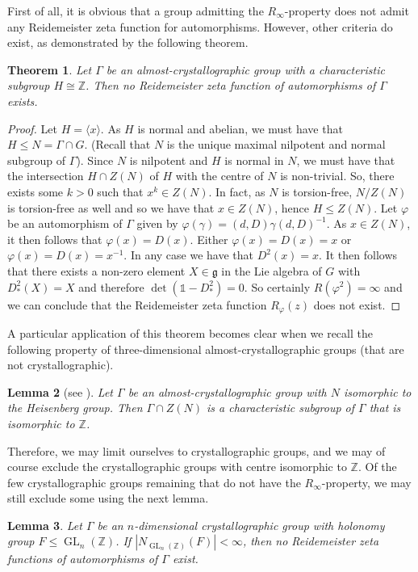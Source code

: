 \documentclass[a4paper]{article}
\theoremstyle{plain}
\newtheorem{theorem}{Theorem}[section]
\newtheorem{lemma}[theorem]{Lemma}
\theoremstyle{definition}
\theoremstyle{remark}
\DeclareMathOperator{\GL}{GL}
\newcommand{\I}{\mathds{1}}
\newcommand{\ZZ}{{\mathbb{Z}}}
\newcommand{\lie}[1]{{\mathfrak {#1}}}
\begin{document}
First of all, it is obvious that a group admitting the \(R_\infty\)-property does not admit any Reidemeister zeta function for automorphisms. However, other criteria do exist, as demonstrated by the following theorem.
\begin{theorem}
	Let \(\Gamma\) be an almost-crystallographic group with a characteristic subgroup \(H \cong \ZZ\). Then no Reidemeister zeta function of automorphisms of \(\Gamma\) exists.
\end{theorem}
\begin{proof}
	Let \(H = \langle x \rangle\). As \(H\) is normal and abelian, we must have that \(H\leq N =\Gamma\cap G\). (Recall that \(N\) is the unique maximal nilpotent and normal subgroup of \(\Gamma\)).  Since \(N\) is nilpotent and \(H\) is normal in \(N\), we must have that the intersection \(H\cap Z(N)\) of \(H\) with the centre of \(N\) is non-trivial. So, there exists some \(k>0\) such that \(x^k\in Z(N)\). In fact, as \(N\) is torsion-free, \(N/Z(N)\) is torsion-free as well and so we have that \(x\in Z(N)\), hence \(H\leq Z(N)\). Let \(\varphi\) be an automorphism of \(\Gamma\) given by \(\varphi(\gamma) = (d,D)\gamma(d,D)^{-1}\). As $x\in Z(N)$, it then follows that $\varphi(x)=D(x)$. Either \(\varphi(x) = D(x)= x\) or \(\varphi(x) = D(x)= x^{-1}\). In any case we have that $D^2(x)=x$. It then follows that there exists a non-zero element $X\in \lie{g}$ in the Lie algebra of $G$ with $D^2_\ast(X)=X$  and therefore \(\det(\I-D^2_*) = 0\). So certainly \(R(\varphi^2) = \infty\) and we can conclude that the Reidemeister zeta function \(R_\varphi(z)\) does not exist.
\end{proof}
A particular application of this theorem becomes clear when we recall the following property of three-dimensional almost-crystallographic groups (that are not crystallographic). 
\begin{lemma}[see {\cite[Lemma 4.3]{dp11-1}}]
	Let \(\Gamma\) be an almost-crystallographic group with \(N\) isomorphic to the Heisenberg group. Then \(\Gamma \cap Z(N)\) is a characteristic subgroup of \(\Gamma\) that is isomorphic to \(\ZZ\). 
\end{lemma}
Therefore, we may limit ourselves to crystallographic groups, and we may of course exclude the crystallographic groups with centre isomorphic to \(\ZZ\). Of the few crystallographic groups remaining that do not have the \(R_\infty\)-property, we may still exclude some using the next lemma.
\begin{lemma}
	\label{lem:crystgroupsnozeta}
	Let \(\Gamma\) be an \(n\)-dimensional crystallographic group with holonomy group \(F \leq \GL_n(\ZZ)\). If \(|N_{\GL_n(\ZZ)}(F)| < \infty\), then no Reidemeister zeta functions of automorphisms of \(\Gamma\) exist.
\end{lemma}
\end{document}
